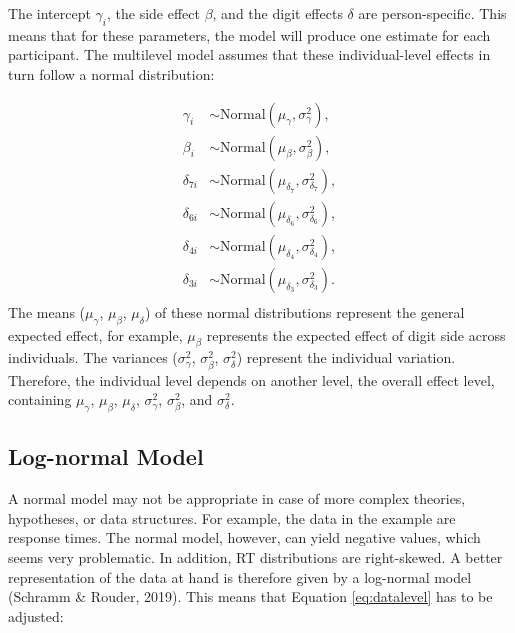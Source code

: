\documentclass[
  english,
  doc,floatsintext]{apa6}
\begin{document}
The intercept \(\gamma_i\), the side effect \(\beta\), and the digit effects \(\delta\) are person-specific. This means that for these parameters, the model will produce one estimate for each participant. The multilevel model assumes that these individual-level effects in turn follow a normal distribution:

\begin{equation}
\begin{aligned}
\gamma_{i} &\sim \text{Normal}(\mu_{\gamma}, \sigma^2_{\gamma}), \label{eq:fixedvsrandom}\\
\beta_{i} &\sim \text{Normal}(\mu_{\beta}, \sigma^2_{\beta}), \\
\delta_{7i} &\sim \text{Normal}(\mu_{\delta_{7}}, \sigma^2_{\delta_{7}}), \\
\delta_{6i} &\sim \text{Normal}(\mu_{\delta_{6}}, \sigma^2_{\delta_{6}}), \\
\delta_{4i} &\sim \text{Normal}(\mu_{\delta_{4}}, \sigma^2_{\delta_{4}}),\\
\delta_{3i} &\sim \text{Normal}(\mu_{\delta_{3}}, \sigma^2_{\delta_{3}}).\\
\end{aligned}
\end{equation}
The means (\(\mu_{\gamma}\), \(\mu_{\beta}\), \(\mu_{\delta}\)) of these normal distributions represent the general expected effect, for example, \(\mu_{\beta}\) represents the expected effect of digit side across individuals. The variances (\(\sigma^2_{\gamma}\), \(\sigma^2_{\beta}\), \(\sigma^2_{\delta}\)) represent the individual variation. Therefore, the individual level depends on another level, the overall effect level, containing \(\mu_{\gamma}\), \(\mu_{\beta}\), \(\mu_{\delta}\), \(\sigma^2_{\gamma}\), \(\sigma^2_{\beta}\), and \(\sigma^2_{\delta}\).

\hypertarget{log-normal-model}{%
\subsection{Log-normal Model}\label{log-normal-model}}

A normal model may not be appropriate in case of more complex theories, hypotheses, or data structures. For example, the data in the example are response times. The normal model, however, can yield negative values, which seems very problematic. In addition, RT distributions are right-skewed. A better representation of the data at hand is therefore given by a log-normal model (Schramm \& Rouder, 2019). This means that Equation \eqref{eq:datalevel} has to be adjusted:
\end{document}
